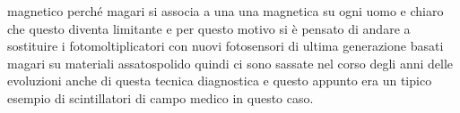 {magnetico perché magari si associa a una una magnetica su ogni uomo e chiaro che questo diventa limitante e per questo motivo si è pensato di andare a sostituire i fotomoltiplicatori con nuovi fotosensori di ultima generazione basati magari su materiali assatospolido quindi ci sono sassate nel corso degli anni delle evoluzioni anche di questa tecnica diagnostica e questo appunto era un tipico esempio di scintillatori di campo medico in questo caso.
}